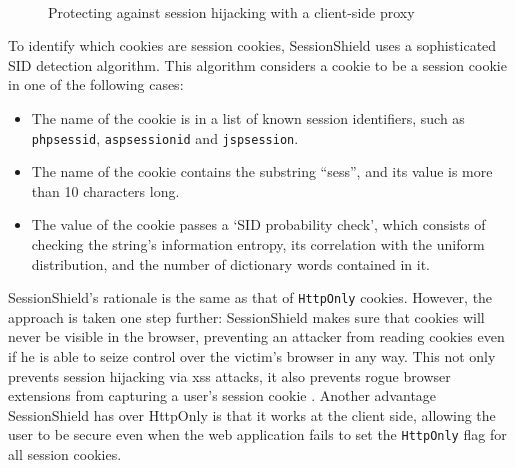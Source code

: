 \begin{figure}[htb]
	\centering
	\\
	\caption{Protecting against session hijacking with a client-side proxy}
	\label{fig:nikiforakis}
\end{figure}

To identify which cookies are session cookies, SessionShield uses a sophisticated SID detection algorithm. This algorithm considers a cookie to be a session cookie in one of the following cases:
\begin{itemize}
	\item The name of the cookie is in a list of known session identifiers, such as \texttt{phpsessid}, \texttt{aspsessionid} and \texttt{jspsession}.
	\item The name of the cookie contains the substring ``sess'', and its value is more than 10 characters long.
	\item The value of the cookie passes a `SID probability check', which consists of checking the string's information entropy, its correlation with the uniform distribution, and the number of dictionary words contained in it.
\end{itemize}

SessionShield's rationale is the same as that of \texttt{HttpOnly} cookies. However, the approach is taken one step further: SessionShield makes sure that cookies will never be visible in the browser, preventing an attacker from reading cookies even if he is able to seize control over the victim's browser in any way. This not only prevents session hijacking via \gls{xss} attacks, it also prevents rogue browser extensions from capturing a user's session cookie \cite{TerLouw2007}. Another advantage SessionShield has over HttpOnly is that it works at the client side, allowing the user to be secure even when the web application fails to set the \texttt{HttpOnly} flag for all session cookies.

